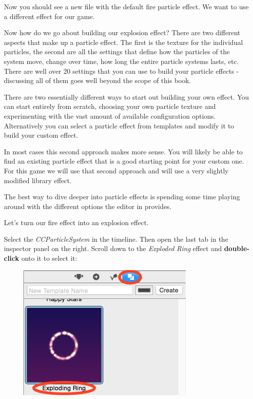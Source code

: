Now you should see a new file with the default fire particle effect. We want to
use a different effect for our game.

Now how do we go about building our explosion effect? There are two different
aspects that make up a particle effect. The first is the texture for the
individual particles, the second are all the settings that define how the
particles of the system move, change over time, how long the entire particle
systems lasts, etc. There are well over 20 settings that you can use to build
your particle effects - discussing all of them goes well beyond the scope of
this book.

There are two essentially different ways to start out building your own effect.
You can start entirely from scratch, choosing your own particle texture and
experimenting with the vast amount of available configuration options.
Alternatively you can select a particle effect from \SB{} templates and modify
it to build your custom effect.

In most cases this second approach makes more sense. You will likely be able to
find an existing particle effect that is a good starting point for your
custom one. For this game we will use that second approach and will use a very
slightly modified library effect.

The best way to dive deeper into particle effects is spending some time playing
around with the different options the editor in \SB{} provides.

Let's turn our fire effect into an explosion effect.

\begin{leftbar}
Select the \textit{CCParticleSystem} in the timeline. Then open the last tab in
the inspector panel on the right. Scroll down to the \textit{Exploded Ring}
effect and \textbf{double-click} onto it to select it:

\begin{figure}[H]
  \centering
  \includegraphics[width=250pt]{images/Chapter9/select_exploded_ring.png}
\end{figure}
\end{leftbar}

